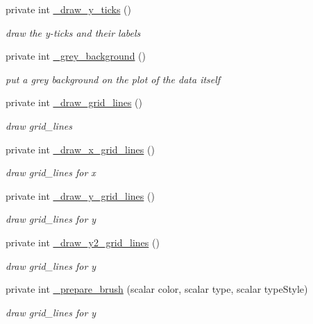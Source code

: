 \begin{DoxyCompactItemize}
private int \hyperlink{classChart_1_1Base_a46852297ab12aaf10546e63dd7eab462}{\_\-draw\_\-y\_\-ticks} ()
\begin{DoxyCompactList}\small\item\em draw the y-\/ticks and their labels \item\end{DoxyCompactList}\item 
private int \hyperlink{classChart_1_1Base_a8bae7e38a6e77c0696f2ef8b06791caa}{\_\-grey\_\-background} ()
\begin{DoxyCompactList}\small\item\em put a grey background on the plot of the data itself \item\end{DoxyCompactList}\item 
private int \hyperlink{classChart_1_1Base_a379e60b338fb8858ce705bdc0e5630fb}{\_\-draw\_\-grid\_\-lines} ()
\begin{DoxyCompactList}\small\item\em draw grid\_\-lines \item\end{DoxyCompactList}\item 
private int \hyperlink{classChart_1_1Base_afb41d27247195ea502c6f5a2d8e21eb6}{\_\-draw\_\-x\_\-grid\_\-lines} ()
\begin{DoxyCompactList}\small\item\em draw grid\_\-lines for x \item\end{DoxyCompactList}\item 
private int \hyperlink{classChart_1_1Base_aac178efe7b3c275cd18fe3c86b4d7a6f}{\_\-draw\_\-y\_\-grid\_\-lines} ()
\begin{DoxyCompactList}\small\item\em draw grid\_\-lines for y \item\end{DoxyCompactList}\item 
private int \hyperlink{classChart_1_1Base_af174cccca9ebbc23f588b6587e88fa1b}{\_\-draw\_\-y2\_\-grid\_\-lines} ()
\begin{DoxyCompactList}\small\item\em draw grid\_\-lines for y \item\end{DoxyCompactList}\item 
private int \hyperlink{classChart_1_1Base_a29c5e6856ca3df71719dc01eff7d1de8}{\_\-prepare\_\-brush} (scalar color, scalar type, scalar typeStyle)
\begin{DoxyCompactList}\small\item\em draw grid\_\-lines for y \item\end{DoxyCompactList}\end{DoxyCompactItemize}
